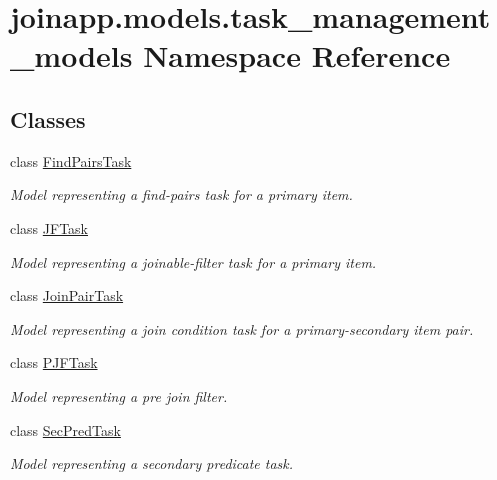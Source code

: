 \hypertarget{namespacejoinapp_1_1models_1_1task__management__models}{}\section{joinapp.\+models.\+task\+\_\+management\+\_\+models Namespace Reference}
\label{namespacejoinapp_1_1models_1_1task__management__models}
\subsection*{Classes}
\begin{DoxyCompactItemize}
\item 
class \mbox{\hyperlink{classjoinapp_1_1models_1_1task__management__models_1_1_find_pairs_task}{Find\+Pairs\+Task}}
\begin{DoxyCompactList}\small\item\em Model representing a find-\/pairs task for a primary item. \end{DoxyCompactList}\item 
class \mbox{\hyperlink{classjoinapp_1_1models_1_1task__management__models_1_1_j_f_task}{J\+F\+Task}}
\begin{DoxyCompactList}\small\item\em Model representing a joinable-\/filter task for a primary item. \end{DoxyCompactList}\item 
class \mbox{\hyperlink{classjoinapp_1_1models_1_1task__management__models_1_1_join_pair_task}{Join\+Pair\+Task}}
\begin{DoxyCompactList}\small\item\em Model representing a join condition task for a primary-\/secondary item pair. \end{DoxyCompactList}\item 
class \mbox{\hyperlink{classjoinapp_1_1models_1_1task__management__models_1_1_p_j_f_task}{P\+J\+F\+Task}}
\begin{DoxyCompactList}\small\item\em Model representing a pre join filter. \end{DoxyCompactList}\item 
class \mbox{\hyperlink{classjoinapp_1_1models_1_1task__management__models_1_1_sec_pred_task}{Sec\+Pred\+Task}}
\begin{DoxyCompactList}\small\item\em Model representing a secondary predicate task. \end{DoxyCompactList}\item 

\end{DoxyCompactItemize}
